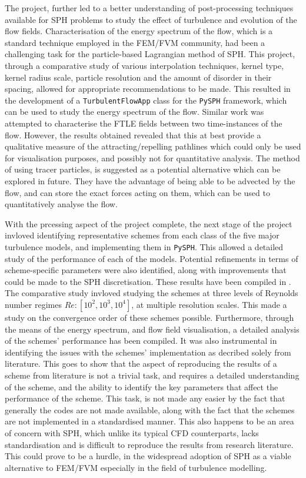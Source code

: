 The project, further led to a better understanding of post-processing techniques available for SPH problems to study the effect of turbulence and evolution of the flow fields.
Characterisation of the energy spectrum of the flow, which is a standard technique employed in the FEM/FVM community, had been a challenging task for the particle-based Lagrangian method of SPH. 
This project, through a comparative study of various interpolation techniques, kernel type, kernel radius scale, particle resolution and the amount of disorder in their spacing, allowed for appropriate recommendations to be made. This resulted in the development of a \texttt{TurbulentFlowApp} class for the \texttt{PySPH} framework, which can be used to study the energy spectrum of the flow.
Similar work was attempted to characterise the FTLE fields between two time-instances of the flow. However, the results obtained revealed that this at best provide a qualitative measure of the attracting/repelling pathlines which could only be used for visualisation purposes, and possibly not for quantitative analysis. The method of using tracer particles, is suggested as a potential alternative which can be explored in future. They have the advantage of being able to be advected by the flow, and can store the exact forces acting on them, which can be used to quantitatively analyse the flow.

With the prcessing aspect of the project complete, the next stage of the project invloved identifying representative schemes from each class of the five major turbulence models, and implementing them in \texttt{PySPH}.
This allowed a detailed study of the performance of each of the models. Potential refinements in terms of scheme-specific parameters were also identified, along with improvements that could be made to the SPH discretisation. These results have been compiled in .
The comparative study invloved studying the schemes at three levels of Reynolds number regimes $Re: [10^2, 10^3, 10^4]$, at multiple resolution scales. This made a study on the convergence order of these schemes possible. Furthermore, through the means of the energy spectrum, and flow field visualisation, a detailed analysis of the schemes' performance has been compiled. It was also instrumental in identifying the issues with the schemes' implementation as decribed solely from literature.
This goes to show that the aspect of reproducing the results of a scheme from literature is not a trivial task, and requires a detailed understanding of the scheme, and the ability to identify the key parameters that affect the performance of the scheme. This task, is not made any easier by the fact that generally the codes are not made available, along with the fact that the schemes are not implemented in a standardised manner.
This also happens to be an area of concern with SPH, which unlike its typical CFD counterparts, lacks standardisation and is difficult to reproduce the results from research literature. This could prove to be a hurdle, in the widespread adoption of SPH as a viable alternative to FEM/FVM especially in the field of turbulence modelling.

